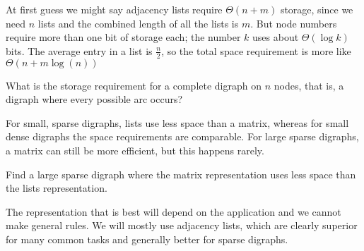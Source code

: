 At first guess we might say adjacency lists require $\Theta(n + m)$ storage, 
since we need $n$ lists and the combined length of all the lists is $m$.
But node numbers require more than one bit of storage each; the number $k$ uses about $\Theta(\log k)$ bits.
The average entry in a list is $\frac n 2$, so the total space requirement is more like $\Theta(n + m \log(n))$ 

\begin{Boxample}[4]
What is the storage requirement for a complete digraph on $n$ nodes, that is, a digraph where every possible arc
occurs?
\end{Boxample}

For small, sparse digraphs, lists use less space than a matrix, whereas for small
dense digraphs the space requirements are comparable. For large sparse
digraphs, a matrix can still be more efficient, but this happens rarely.

\begin{Boxample}[4]
Find a large sparse digraph where the matrix representation uses less space than the lists representation.
\end{Boxample}

The representation that is best will depend on the application and we cannot make general rules.  
We will mostly use adjacency lists, which are
clearly superior for many common tasks and generally better for sparse digraphs.

